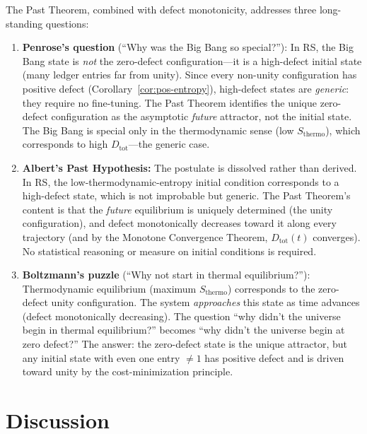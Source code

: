 \documentclass[12pt,a4paper]{article}
\theoremstyle{definition}
\theoremstyle{remark}
\begin{document}
The Past Theorem, combined with defect monotonicity, addresses three
long-standing questions:

\begin{enumerate}
  \item \textbf{Penrose's question} (``Why was the Big Bang so special?''):
  In RS, the Big Bang state is \emph{not} the zero-defect
  configuration---it is a high-defect initial state (many ledger entries
  far from unity).  Since every non-unity configuration has positive defect
  (Corollary~\ref{cor:pos-entropy}), high-defect states are
  \emph{generic}: they require no fine-tuning.  The Past Theorem
  identifies the unique zero-defect configuration as the asymptotic
  \emph{future} attractor, not the initial state.  The Big Bang is special
  only in the thermodynamic sense (low $S_{\mathrm{thermo}}$), which
  corresponds to high $D_{\mathrm{tot}}$---the generic case.

  \item \textbf{Albert's Past Hypothesis:}  The postulate is dissolved
  rather than derived.  In RS, the low-thermodynamic-entropy initial
  condition corresponds to a high-defect state, which is not improbable
  but generic.  The Past Theorem's content is that the \emph{future}
  equilibrium is uniquely determined (the unity configuration), and
  defect monotonically decreases toward it along every trajectory
  (and by the Monotone Convergence Theorem, $D_{\mathrm{tot}}(t)$
  converges).  No statistical reasoning or measure on initial
  conditions is required.

  \item \textbf{Boltzmann's puzzle} (``Why not start in thermal
  equilibrium?''): Thermodynamic equilibrium (maximum $S_{\mathrm{thermo}}$)
  corresponds to the zero-defect unity configuration.  The system
  \emph{approaches} this state as time advances (defect monotonically
  decreasing).  The question ``why didn't the universe begin in thermal
  equilibrium?'' becomes ``why didn't the universe begin at zero defect?''
  The answer: the zero-defect state is the unique attractor, but any
  initial state with even one entry $\neq 1$ has positive defect and
  is driven toward unity by the cost-minimization principle.
\end{enumerate}

\section{Discussion}
\label{sec:discuss}
\end{document}
